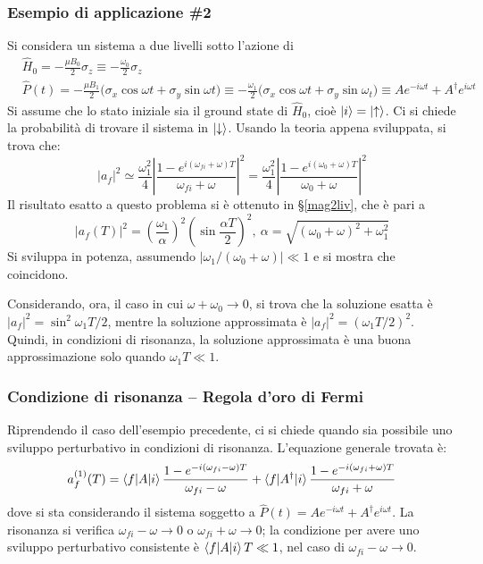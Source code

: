\documentclass[11pt, a4paper]{scrartcl} %
\numberwithin{equation}{subsection}
\theoremstyle{style2}
\theoremstyle{style1}
\begin{document}
\subsubsection{Esempio di applicazione \#2}
Si considera un sistema a due livelli sotto l'azione di 
\[
	\begin{split}
		&\hat{H}_0 = - \frac{\mu B_0}{2}\sigma _z \equiv -\frac{\omega_0}{2} \sigma _z \\
		&\hat{P}(t) = - \frac{\mu B_1}{2} \big(\sigma _x \cos \omega t  + \sigma _y \sin \omega t \big) \equiv - \frac{\omega_1}{2}\big(\sigma _x \cos \omega t + \sigma _y \sin \omega _t\big)\equiv A e^{-i\omega t} + A^\dagger e^{i\omega t} 
	\end{split}
\] 
Si assume che lo stato iniziale sia il ground state di $\hat{H}_0$, cio\`e $\ket{i} = \ket{\uparrow} $.
Ci si chiede la probabilit\`a di trovare il sistema in $\ket{\downarrow} $.
Usando la teoria appena sviluppata, si trova che:
\begin{equation}
	\lvert a_f \rvert ^2 \simeq \frac{\omega_1^2}{4} \left\lvert \frac{1-e^{i(\omega_{fi} + \omega)T} }{\omega_{fi} +\omega} \right\rvert  ^2 = \frac{\omega_1^2}{4} \left\lvert \frac{1-e^{i(\omega_0 + \omega)T} }{\omega_0+\omega} \right\rvert  ^2 
\end{equation}
Il risultato esatto a questo problema si \`e ottenuto in \S\ref{mag2liv}, che \`e pari a 
\[
\lvert a_f(T) \rvert ^2 = \left(\frac{\omega_1}{\alpha }\right) ^2 \left(\sin \frac{\alpha T}{2}\right) ^2, \ \alpha  = \sqrt{(\omega_0+\omega)^2 + \omega_1^2} 
\] 
Si sviluppa in potenza, assumendo $\lvert \omega_1 / (\omega_0+\omega) \rvert \ll 1$ e si mostra che coincidono.

Considerando, ora, il caso in cui $\omega + \omega _0 \to 0$, si trova che la soluzione esatta \`e $\lvert a_f \rvert ^2 = \sin^2 \omega_1 T / 2$, mentre la soluzione approssimata \`e $\lvert a_f \rvert ^2 = (\omega_1 T / 2 )^2$.
Quindi, in condizioni di risonanza, la soluzione approssimata \`e una buona approssimazione solo quando $\omega_1 T \ll 1$.
\subsubsection{Condizione di risonanza -- Regola d'oro di Fermi}

Riprendendo il caso dell'esempio precedente, ci si chiede quando sia possibile uno sviluppo perturbativo in condizioni di risonanza. 
L'equazione generale trovata \`e:
\begin{equation}
	a_f^{(1)} (T) = \braket{f|A|i} \frac{1- e^{-i(\omega _{fi} - \omega)T} }{\omega_{fi} - \omega} + \braket{f|A^\dagger |i} \frac{1- e^{-i (\omega_{fi} +\omega)T} }{\omega_{fi} +\omega}
\end{equation}
dove si sta considerando il sistema soggetto a $\hat{P}(t) = A e^{-i\omega t} + A^\dagger e^{i\omega t} $.
La risonanza si verifica $\omega_{fi} -\omega \to 0$ o $\omega_{fi} +\omega \to 0$; la condizione per avere uno sviluppo perturbativo consistente \`e $\braket{f|A|i} T \ll 1$, nel caso di $\omega_{fi} -\omega \to 0$.
\end{document}
